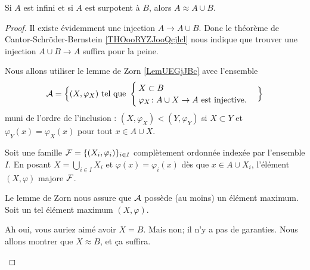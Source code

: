 \begin{lemma}       \label{LEMooXMVDooIWLWis}
    Si \( A\) est infini et si \( A\) est surpotent à \( B\), alors \( A\approx A\cup B\).
\end{lemma}

\begin{proof}
    Il existe évidemment une injection \( A\to A\cup B\). Donc le théorème de Cantor-Schröder-Bernstein \ref{THOooRYZJooQcjlcl} nous indique que trouver une injection \( A\cup B\to A\) suffira pour la peine.

    Nous allons utiliser le lemme de Zorn \ref{LemUEGjJBc} avec l'ensemble
    \begin{equation}
       \mathcal{A}=\Big\{  (X,\varphi_X)  \text{ tel que }
        \begin{cases}
            X\subset B\\
            \varphi_X\colon A\cup X\to A\text{ est injective.}
        \end{cases}
    \Big\}
    \end{equation}
    muni de l'ordre de l'inclusion : \( (X,\varphi_X)<(Y,\varphi_Y)\) si \( X\subset Y\) et \( \varphi_Y(x)=\varphi_X(x)\) pour tout \( x\in A\cup X\).
    
    \begin{subproof}
        \item[\( \mA\) est inductif]
            Soit une famille \( \mathcal{F}=\{ (X_i,\varphi_i) \}_{i\in I}\) complètement ordonnée indexée par l'ensemble \( I\). En posant \( X=\bigcup_{i\in I}X_i\) et \( \varphi(x)=\varphi_i(x)\) dès que \( x\in A\cup X_i\), l'élément \( (X,\varphi)\) majore \( \mathcal{F}\).
        \item[Un maximum]
            Le lemme de Zorn nous assure que \( \mA\) possède (au moins) un élément maximum. Soit un tel élément maximum \( (X,\varphi)\). 
        \item[\( X\approx B\)]
            Ah oui, vous auriez aimé avoir \( X=B\). Mais non; il n'y a pas de garanties. Nous allons montrer que \( X\approx B\), et ça suffira.


\end{subproof}
\end{proof}
